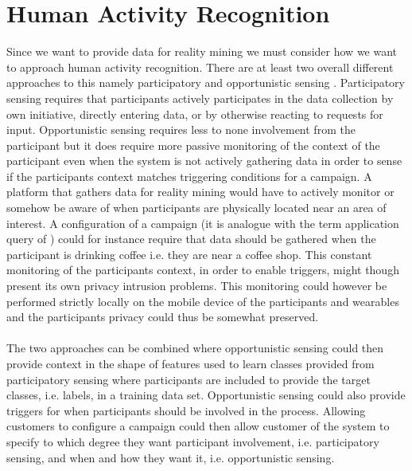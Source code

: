 
\section{Human Activity Recognition}
\label{sec:human_activity_recognition}

Since we want to provide data for reality mining we must consider how we want to approach human activity recognition. There are at least two overall different approaches to this namely participatory and opportunistic sensing \parencite{opp_or_par} \parencite{har_wearables}. Participatory sensing requires that participants actively participates in the data collection by own initiative, directly entering data, or by otherwise reacting to requests for input. Opportunistic sensing requires less to none involvement from the participant but it does require more passive monitoring of the context of the participant even when the system is not actively gathering data in order to sense if the participants context matches triggering conditions for a campaign. A platform that gathers data for reality mining would have to actively monitor or somehow be aware of when participants are physically located near an area of interest. A configuration of a campaign (it is analogue with the term application query of \parencite{opp_or_par}) could for instance require that data should be gathered when the participant is drinking coffee i.e. they are near a coffee shop. This constant monitoring of the participants context, in order to enable triggers, might though present its own privacy intrusion problems. This monitoring could however be performed strictly locally on the mobile device of the participants and wearables and the participants privacy could thus be somewhat preserved.
\\\\
The two approaches can be combined where opportunistic sensing could then provide context in the shape of features used to learn classes provided from participatory sensing where participants are included to provide the target classes, i.e. labels, in a training data set. Opportunistic sensing could also provide triggers for when participants should be involved in the process. Allowing customers to configure a campaign could then allow customer of the system to specify to which degree they want participant involvement, i.e. participatory sensing, and when and how they want it, i.e. opportunistic sensing.
\\\\
